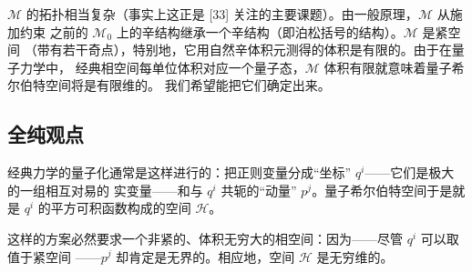 \documentclass[11pt,a4paper]{article}
\begin{document}

$\mathcal{M}$ 的拓扑相当复杂（事实上这正是 [33] 关注的主要课题）。由一般原理，$\mathcal{M}$ 从施加约束
之前的 $\mathcal{M}_0$ 上的辛结构继承一个辛结构（即泊松括号的结构）。$\mathcal{M}$ 是紧空间
（带有若干奇点），特别地，它用自然辛体积元测得的体积是有限的。由于在量子力学中，
经典相空间每单位体积对应一个量子态，$\mathcal{M}$ 体积有限就意味着量子希尔伯特空间将是有限维的。
我们希望能把它们确定出来。


\subsection{全纯观点}

经典力学的量子化通常是这样进行的：把正则变量分成“坐标” $q^i$——它们是极大的一组相互对易的
实变量——和与 $q^i$ 共轭的“动量” $p^j$。量子希尔伯特空间于是就是 $q^i$ 的平方可积函数构成的空间
$\mathcal{H}$。

这样的方案必然要求一个非紧的、体积无穷大的相空间：因为——尽管 $q^i$ 可以取值于紧空间
——$p^j$ 却肯定是无界的。相应地，空间 $\mathcal{H}$ 是无穷维的。
\end{document}

